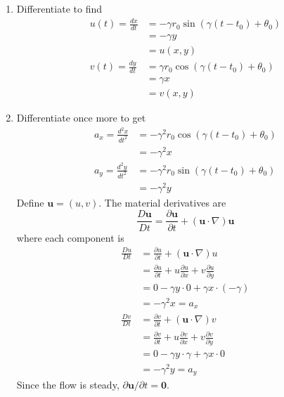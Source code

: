 \documentclass[a4paper]{article}
\begin{document}
\begin{enumerate}[label=(\alph*)]
	\item Differentiate to find
	\begin{align*}
		u \!\left( t \right) = \frac{d x}{d t} & = -\gamma r_{0}\sin\!\left(\gamma \!\left( t - t_{0} \right) + \theta_{0} \right) \\
						       & = -\gamma y \\
						       & = u \!\left( x,y \right) \\
		v \!\left( t \right) = \frac{d y}{d t} & = \gamma r_{0}\cos\!\left(\gamma \!\left( t - t_{0} \right) + \theta_{0} \right) \\
						       & = \gamma x \\
						       & = v \!\left( x,y \right)
	\end{align*}
	\item Differentiate once more to get
	\begin{align*}
		a_{x} = \frac{d^2 x}{d t^2} & = -\gamma^{2}r_{0}\cos\!\left(\gamma \!\left( t - t_{0} \right) + \theta_{0} \right) \\
					    & = -\gamma^{2}x \\
		a_{y} = \frac{d^2 y}{d t^2} & = -\gamma^{2}r_{0}\sin\!\left(\gamma \!\left( t - t_{0} \right) + \theta_{0} \right) \\ 
					    & = -\gamma^{2}y
	\end{align*}
	Define \( \pmb{u} = \!\left( u,v \right) \). The material derivatives are
	\[
		\frac{D \pmb{u}}{Dt} = \frac{\partial \pmb{u}}{\partial t} + \!\left( \pmb{u} \cdot \nabla \right) \pmb{u}
	\]
	where each component is
	\begin{align*}
		\frac{Du}{Dt} & = \frac{\partial u}{\partial t} + \!\left( \pmb{u} \cdot \nabla \right)u \\
		 & = \frac{\partial u}{\partial t} + u \frac{\partial u}{\partial x} + v \frac{\partial u}{\partial y} \\ 
		 & = 0 - \gamma y \cdot 0 + \gamma x \cdot \!\left( -\gamma \right) \\
		 & = -\gamma^{2}x = a_{x} \\
		\frac{Dv}{Dt} & = \frac{\partial v}{\partial t} + \!\left( \pmb{u} \cdot \nabla \right)v \\
			      & = \frac{\partial v}{\partial t} + u \frac{\partial v}{\partial x} + v \frac{\partial v}{\partial y} \\
			      & = 0 - \gamma y \cdot \gamma + \gamma x \cdot 0 \\
			      & = -\gamma^{2}y = a_{y}
	\end{align*}
	Since the flow is steady, \( \partial \pmb{u} / \partial t = \pmb{0} \).
\end{enumerate}
\end{document}
